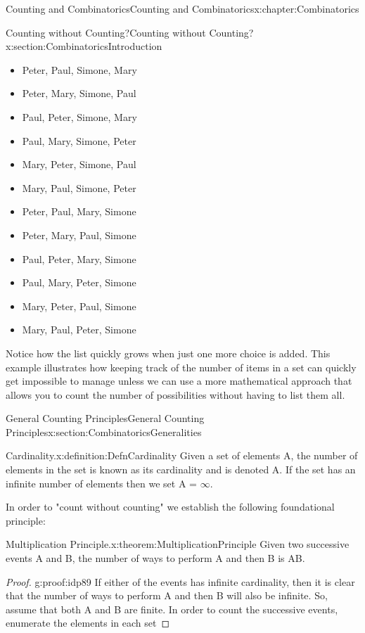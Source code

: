 \documentclass[oneside,10pt,]{book}
\numberwithin{equation}{section}
\begin{document}
\begin{chapterptx}{Counting and Combinatorics}{}{Counting and Combinatorics}{}{}{x:chapter:Combinatorics}
\begin{sectionptx}{Counting without Counting?}{}{Counting without Counting?}{}{}{x:section:CombinatoricsIntroduction}
\begin{itemize}[label=\textbullet]
\item{}Peter, Paul, Simone, Mary%
\item{}Peter, Mary, Simone, Paul%
\item{}Paul, Peter, Simone, Mary%
\item{}Paul, Mary, Simone, Peter%
\item{}Mary, Peter, Simone, Paul%
\item{}Mary, Paul, Simone, Peter%
\item{}Peter, Paul, Mary, Simone%
\item{}Peter, Mary, Paul, Simone%
\item{}Paul, Peter, Mary, Simone%
\item{}Paul, Mary, Peter, Simone%
\item{}Mary, Peter, Paul, Simone%
\item{}Mary, Paul, Peter, Simone%
\end{itemize}
Notice how the list quickly grows when just one more choice is added. This example illustrates how keeping track of the number of items in a set can quickly get impossible to manage unless we can use a more mathematical approach that allows you to count the number of possibilities without having to list them all.%
\end{sectionptx}
%
%
\typeout{************************************************}
\typeout{************************************************}
%
\begin{sectionptx}{General Counting Principles}{}{General Counting Principles}{}{}{x:section:CombinatoricsGeneralities}
\begin{definition}{Cardinality.}{x:definition:DefnCardinality}%
Given a set of elements A, the number of elements in the set is known as its cardinality and is denoted \textbar{}A\textbar{}. If the set has an infinite number of elements then we set \textbar{}A\textbar{} = \(\infty\).%
\end{definition}
In order to "count without counting" we establish the following foundational principle:%
\begin{theorem}{Multiplication Principle.}{}{x:theorem:MultiplicationPrinciple}%
Given two successive events A and B, the number of ways to perform A and then B is \textbar{}A\textbar{}\textbar{}B\textbar{}.%
\end{theorem}
\begin{proof}{}{g:proof:idp89}
If either of the events has infinite cardinality, then it is clear that the number of ways to perform A and then B will also be infinite. So, assume that both \textbar{}A\textbar{} and \textbar{}B\textbar{} are finite. In order to count the successive events, enumerate the elements in each set%

\end{proof}
\end{sectionptx}
\end{chapterptx}
\end{document}
